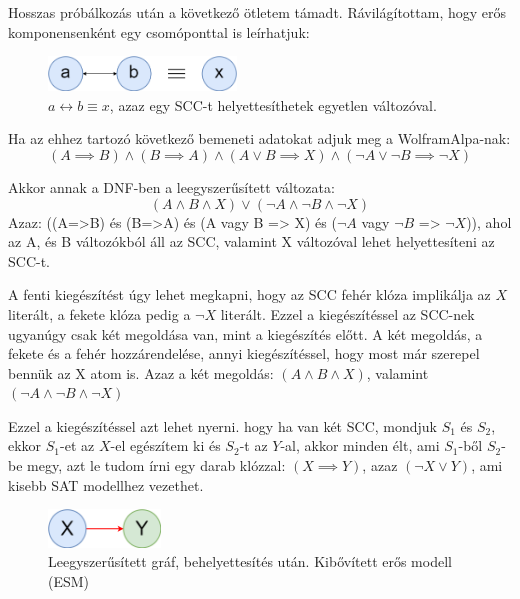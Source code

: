 \documentclass[
]{thesis-ekf}
\theoremstyle{definition}
\theoremstyle{remark}
\begin{document}
	Hosszas próbálkozás után a következő ötletem támadt. Rávilágítottam, hogy erős komponensenként egy csomóponttal is leírhatjuk:
	
	\begin{figure}[!ht]
		\centering
		\includegraphics[width=5cm]{images/sajat_pelda}
		\caption{$ a\leftrightarrow b\equiv x$, azaz egy \textsc{SCC}-t helyettesíthetek egyetlen változóval.}
		\label{abra-sajatpelda-ab-x}
	\end{figure}
	
	Ha az ehhez tartozó következő bemeneti adatokat adjuk meg a WolframAlpa-nak:
	\[ (A\implies B)\wedge(B\implies A)\wedge(A\vee B \implies X)\wedge(\neg A\vee\neg B\implies\neg X) \]

	Akkor annak a \textsc{DNF}-ben a leegyszerűsített változata:
	\[ (A\wedge B\wedge X)\vee(\neg A\wedge\neg B\wedge\neg X) \]	
	Azaz: ((A=>B) és (B=>A) és (A vagy B => X) és ($ \neg A $ vagy $ \neg B $ => $ \neg X $)), ahol az A, és B változókból áll az \textsc{SCC}, valamint X változóval lehet helyettesíteni az \textsc{SCC}-t.
	
	A fenti kiegészítést úgy lehet megkapni, hogy az \textsc{SCC} fehér klóza implikálja az $ X $ literált, a fekete klóza pedig a $ \neg X $ literált. Ezzel a kiegészítéssel az \textsc{SCC}-nek ugyanúgy csak két megoldása van, mint a kiegészítés előtt. A két megoldás, a fekete és a fehér hozzárendelése, annyi kiegészítéssel, hogy most már szerepel bennük az X atom is. Azaz a két megoldás: $ (A \wedge B \wedge X) $, valamint $ (\neg A \wedge \neg B \wedge \neg X) $
	
	Ezzel a kiegészítéssel azt lehet nyerni. hogy ha van két \textsc{SCC}, mondjuk $ S_1 $ és $ S_2 $, ekkor $ S_1 $-et az $ X $-el egészítem ki és $ S_2 $-t az $ Y $-al, akkor minden élt, ami $ S_1 $-ből $ S_2 $-be megy, azt le tudom írni egy darab klózzal: $ (X\implies Y) $, azaz $ (\neg X\vee Y) $, ami kisebb \textsc{SAT} modellhez vezethet.
	
	\begin{figure}[!ht]
		\centering
		\includegraphics[width=3cm]{images/sajat_pelda_5_9_to_esm}
		\caption{Leegyszerűsített gráf, behelyettesítés után. Kibővített erős modell (\textsc{ESM})}
		\label{abra-sajatpelda-59to-esm}
	\end{figure}
\end{document}
